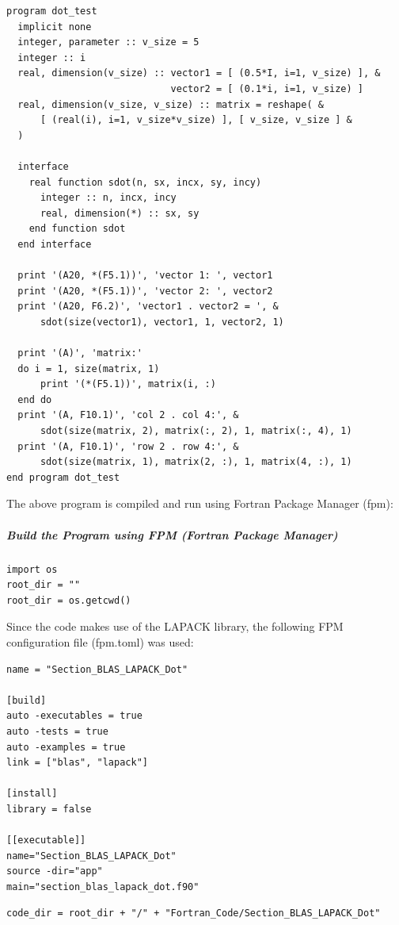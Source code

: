 \begin{verbatim}
program dot_test
  implicit none
  integer, parameter :: v_size = 5
  integer :: i
  real, dimension(v_size) :: vector1 = [ (0.5*I, i=1, v_size) ], &
                             vector2 = [ (0.1*i, i=1, v_size) ]
  real, dimension(v_size, v_size) :: matrix = reshape( &
      [ (real(i), i=1, v_size*v_size) ], [ v_size, v_size ] &
  )

  interface
    real function sdot(n, sx, incx, sy, incy)
      integer :: n, incx, incy
      real, dimension(*) :: sx, sy
    end function sdot
  end interface

  print '(A20, *(F5.1))', 'vector 1: ', vector1
  print '(A20, *(F5.1))', 'vector 2: ', vector2
  print '(A20, F6.2)', 'vector1 . vector2 = ', &
      sdot(size(vector1), vector1, 1, vector2, 1)

  print '(A)', 'matrix:'
  do i = 1, size(matrix, 1)
      print '(*(F5.1))', matrix(i, :)
  end do
  print '(A, F10.1)', 'col 2 . col 4:', &
      sdot(size(matrix, 2), matrix(:, 2), 1, matrix(:, 4), 1)
  print '(A, F10.1)', 'row 2 . row 4:', &
      sdot(size(matrix, 1), matrix(2, :), 1, matrix(4, :), 1)
end program dot_test
\end{verbatim}

The above program is compiled and run using Fortran Package Manager (fpm):

\subparagraph{Build the Program using FPM (Fortran Package Manager)}

\begin{verbatim}
import os
root_dir = ""
root_dir = os.getcwd()
\end{verbatim}

Since the code makes use of the LAPACK library, the following FPM configuration file (fpm.toml) was used:

\begin{verbatim}
name = "Section_BLAS_LAPACK_Dot"

[build]
auto -executables = true
auto -tests = true
auto -examples = true
link = ["blas", "lapack"]

[install]
library = false

[[executable]]
name="Section_BLAS_LAPACK_Dot"
source -dir="app"
main="section_blas_lapack_dot.f90"
\end{verbatim}

\begin{verbatim}
code_dir = root_dir + "/" + "Fortran_Code/Section_BLAS_LAPACK_Dot"
\end{verbatim}

